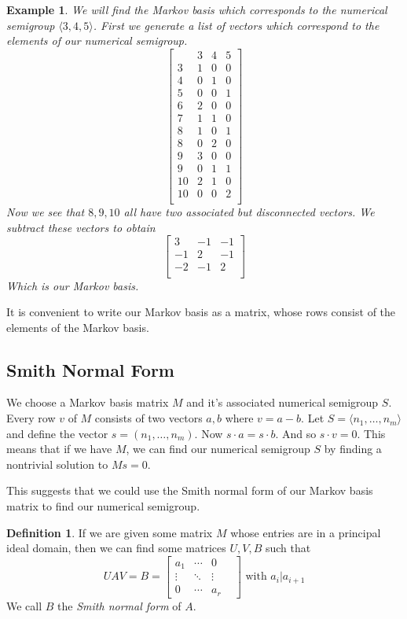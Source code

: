 \documentclass[11pt]{amsart}
\theoremstyle{plain}
\newtheorem{exa}{Example}
\theoremstyle{definition}
\newtheorem{defi}{Definition}
\begin{document}
\begin{exa}
  We will find the Markov basis which corresponds to the numerical semigroup
$\langle 3,4,5\rangle$. First we generate a list of vectors which correspond
to the elements of our numerical semigroup.
\[\left[\begin{array}{r|rrr}
&3&4&5\\
\hline
3&1&0&0\\
4&0&1&0\\
5&0&0&1\\
6&2&0&0\\
7&1&1&0\\
8&1&0&1\\
8&0&2&0\\
9&3&0&0\\
9&0&1&1\\
10&2&1&0\\
10&0&0&2\\
\end{array}\right]
\]
Now we see that $8,9,10$ all have two associated but disconnected vectors. We
subtract these vectors to obtain
\[
  \left[\begin{array}{rrr}
  3&-1&-1\\
  -1&2&-1\\
  -2&-1&2\\
  \end{array}\right]
\]
Which is our Markov basis.
\end{exa}

It is convenient to write our Markov basis as a matrix, whose rows consist of
the elements of the Markov basis.
\subsection{Smith Normal Form}
We choose a Markov basis matrix $M$ and it's associated numerical semigroup $S$.
Every row $v$ of $M$ consists of two vectors $a,b$ where $v=a-b$. Let $S=
\langle n_1,\dots,n_m\rangle$ and define the vector $s=(n_1,\dots,n_m)$. Now
$s\cdot a=s\cdot b$. And so $s\cdot v=0$. This means that if we have $M$, we can
find our numerical semigroup $S$ by finding a nontrivial solution to $Ms=0$.

This suggests that we could use the Smith normal form of our Markov basis matrix
to find our numerical semigroup.
\begin{defi}
  If we are given some matrix $M$ whose entries are in a principal ideal domain,
  then we can find some matrices $U,V,B$ such that
\[UAV=B=
\left[\begin{array}{cccc}
  a_1&\cdots&0\\
  \vdots&\ddots&\vdots \\
  0&\cdots&a_r&
\end{array}\right]
\text{ with }a_i|a_{i+1}\]
We call $B$ the \emph{Smith normal form} of $A$.\cite{adkins}
\end{defi}
\end{document}
